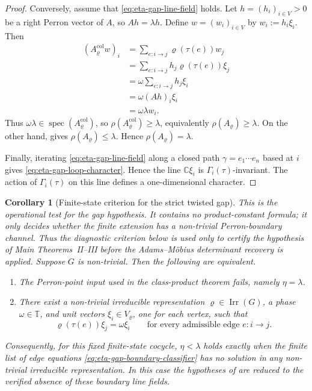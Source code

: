 \documentclass[11pt,a4paper]{amsart}
\theoremstyle{plain}
\newtheorem{corollary}[theorem]{Corollary}
\theoremstyle{definition}
\theoremstyle{remark}
\DeclareMathOperator{\spec}{spec}
\DeclareMathOperator{\Irr}{Irr}
\newcommand{\CC}{\mathbb{C}}
\newcommand{\TT}{\mathbb{T}}
\begin{document}
\begin{proof}
  Conversely, assume that \eqref{eq:eta-gap-line-field} holds. Let
  \(h=(h_i)_{i\in V}>0\) be a right Perron vector of \(A\), so
  \(Ah=\lambda h\). Define \(w=(w_i)_{i\in V}\) by
  \(w_i:=h_i\xi_i\). Then
  \begin{align*}
    (A_\varrho^{\mathrm{col}} w)_i
    &=
    \sum_{e:i\to j}\varrho(\tau(e))w_j \\
    &=
    \sum_{e:i\to j}h_j\varrho(\tau(e))\xi_j \\
    &=
    \omega\sum_{e:i\to j}h_j\xi_i \\
    &=
    \omega(Ah)_i\xi_i \\
    &=
    \omega\lambda w_i.
  \end{align*}
  Thus \(\omega\lambda\in\spec(A_\varrho^{\mathrm{col}})\), so
  \(\rho(A_\varrho^{\mathrm{col}})\ge \lambda\), equivalently
  \(\rho(A_\varrho)\ge \lambda\). On the other hand,
   gives
  \(\rho(A_\varrho)\le \lambda\). Hence
  \(\rho(A_\varrho)=\lambda\).

  Finally, iterating \eqref{eq:eta-gap-line-field} along a closed path
  \(\gamma=e_1\cdots e_n\) based at \(i\) gives
  \eqref{eq:eta-gap-loop-character}. Hence the line \(\CC\xi_i\) is
  \(\Gamma_i(\tau)\)-invariant. The action of \(\Gamma_i(\tau)\) on
  this line defines a one-dimensional character.
\end{proof}

\begin{corollary}[Finite-state criterion for the strict twisted gap]
  \label{cor:eta-gap-boundary-classifier}
This is the operational test for the gap hypothesis.  It contains no
product-constant formula; it only decides whether the finite extension has
a non-trivial Perron-boundary channel.  Thus the diagnostic criterion below is
used only to certify the hypothesis of Main Theorems~II--III before the
Adams--M\"obius determinant recovery is applied.
  Suppose \(G\) is non-trivial. Then the following are equivalent.
  \begin{enumerate}
    \item The Perron-point input used in the class-product theorem fails,
      namely \(\eta=\lambda\).
    \item There exist a non-trivial irreducible representation
      \(\varrho\in\Irr(G)\), a phase \(\omega\in\TT\), and unit vectors
      \(\xi_i\in V_\varrho\), one for each vertex, such that
      \begin{equation}\label{eq:eta-gap-boundary-classifier}
        \varrho(\tau(e))\xi_j=\omega\xi_i
        \qquad
        \text{for every admissible edge } e:i\to j.
      \end{equation}
  \end{enumerate}
  Consequently, for this fixed finite-state cocycle, \(\eta<\lambda\) holds
  exactly when the finite list of edge equations
  \eqref{eq:eta-gap-boundary-classifier} has no solution in any non-trivial
  irreducible representation. In this case the hypotheses of
   are reduced to the verified absence
  of these boundary line fields.
\end{corollary}
\end{document}

